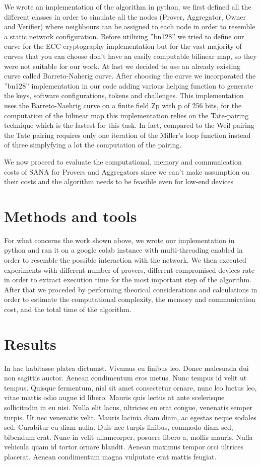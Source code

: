 \documentclass[10pt, a4paper, twocolumn]{article} %
\begin{document}
We wrote an implementation of the algorithm in python, we first defined all the different classes in order to simulate all the nodes (Prover, Aggregator, Owner and Verifier) where neighbours can be assigned to each node in order to resemble a static network configuration.
Before utilizing ''bn128'' we tried to define our curve for the ECC cryptography implementation but for the vast majority of curves that you can choose don't have an easily computable bilinear map, so they were not suitable for our work. At last we decided to use an already existing curve called Barreto-Naherig curve.
After choosing the curve we incorporated the ''bn128'' implementation in our code adding various helping function to generate the keys, software configurations, tokens and challenges.
This implementation uses the Barreto-Naehrig curve on a finite field Zp with p of 256 bits, for the computation of the bilinear map this implementation relies on the Tate-pairing technique which is the fastest for this task. In fact, compared to the Weil pairing the Tate pairing requires only one iteration of the Miller's loop function instead of three simplyfying a lot the computation of the pairing.

We now proceed to evaluate the computational, memory and communication costs of SANA for Provers and Aggregators since we can't make assumption on their costs and the algorithm needs to be feasible even for low-end devices

\section{Methods and tools}

For what concerns the work shown above, we wrote our implementation in python and ran it on a google colab instance with multi-threading enabled in order to resemble the possible interaction with the network.
We then executed experiments with different number of provers, different compromised devices rate in order to extract execution time for the most important step of the algorithm.
After that we proceded by performing theorical considerations and calculations in order to estimate the computational complexity, the memory and communication cost, and the total time of the algorithm.
\section{Results}

In hac habitasse platea dictumst. Vivamus eu finibus leo. Donec malesuada dui non sagittis auctor. Aenean condimentum eros metus. Nunc tempus id velit ut tempus. Quisque fermentum, nisl sit amet consectetur ornare, nunc leo luctus leo, vitae mattis odio augue id libero. Mauris quis lectus at ante scelerisque sollicitudin in eu nisi. Nulla elit lacus, ultricies eu erat congue, venenatis semper turpis. Ut nec venenatis velit. Mauris lacinia diam diam, ac egestas neque sodales sed. Curabitur eu diam nulla. Duis nec turpis finibus, commodo diam sed, bibendum erat. Nunc in velit ullamcorper, posuere libero a, mollis mauris. Nulla vehicula quam id tortor ornare blandit. Aenean maximus tempor orci ultrices placerat. Aenean condimentum magna vulputate erat mattis feugiat.
\end{document}
